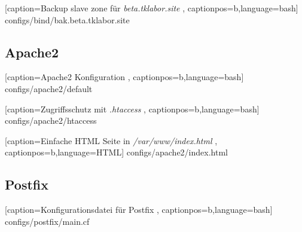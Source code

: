 
    [caption={Backup slave zone für \textit{beta.tklabor.site}}
       \label{lst:back.beta.tklabor.site-cfg},
       captionpos=b,language=bash]
{configs/bind/bak.beta.tklabor.site}

\subsection{Apache2}

    [caption={Apache2 Konfiguration}
       \label{lst:auth-config-cfg},
       captionpos=b,language=bash]
{configs/apache2/default}


    [caption={Zugriffsschutz mit \textit{.htaccess}}
       \label{lst:htaccess-cfg},
       captionpos=b,language=bash]
{configs/apache2/htaccess}


    [caption={Einfache HTML Seite in \textit{/var/www/index.html}}
       \label{lst:index.html-cfg},
       captionpos=b,language=HTML]
{configs/apache2/index.html}

\subsection{Postfix}

    [caption={Konfigurationsdatei für Postfix}
       \label{lst:postifx-main-cfg},
       captionpos=b,language=bash]
{configs/postfix/main.cf}